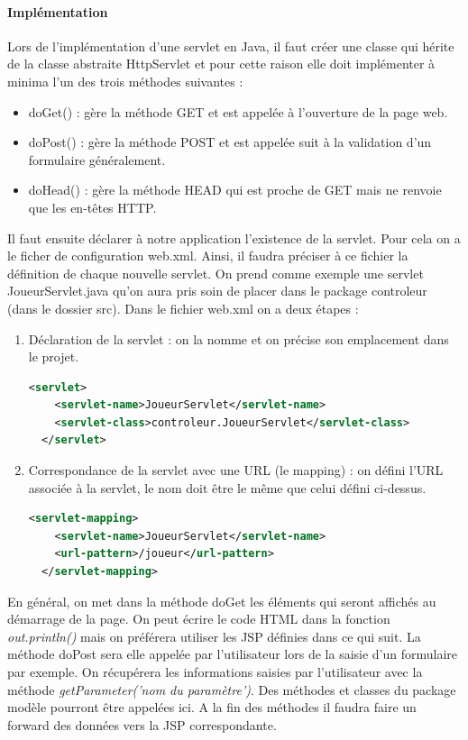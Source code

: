 \paragraph{Implémentation}
Lors de l'implémentation d'une servlet en Java, il faut créer une classe qui hérite de la classe abstraite HttpServlet et pour cette raison elle doit implémenter à
minima l'un des trois méthodes suivantes :
\begin{itemize}
 \item doGet() : gère la méthode GET et est appelée à l'ouverture de la page web.
 \item doPost() : gère la méthode POST et est appelée suit à la validation d'un formulaire généralement.
 \item doHead() : gère la méthode HEAD qui est proche de GET mais ne renvoie que les en-têtes HTTP.
\end{itemize}
Il faut ensuite déclarer à notre application l'existence de la servlet. Pour cela on a le ficher de configuration web.xml. Ainsi, il faudra préciser à ce fichier la définition de chaque nouvelle servlet.
On prend comme exemple une servlet JoueurServlet.java qu'on aura pris soin de placer dans le package controleur (dans le dossier src). Dans le fichier web.xml on a deux étapes :
\begin{enumerate}
 \item Déclaration de la servlet : on la nomme et on précise son emplacement dans le projet.
\begin{lstlisting}[language=XML]
  <servlet>
    <servlet-name>JoueurServlet</servlet-name>
    <servlet-class>controleur.JoueurServlet</servlet-class>
  </servlet>
\end{lstlisting}  
 \item Correspondance de la servlet avec une URL (le mapping) : on défini l'URL associée à la servlet, le nom doit être le même que celui défini ci-dessus.
\begin{lstlisting}[language=XML]
  <servlet-mapping>
    <servlet-name>JoueurServlet</servlet-name>
    <url-pattern>/joueur</url-pattern>
  </servlet-mapping>
\end{lstlisting}  
\end{enumerate}

En général, on met dans la méthode doGet les éléments qui seront affichés au démarrage de la page. On peut écrire le code HTML dans la fonction \textit{out.println()} mais on préférera utiliser les JSP définies dans ce qui suit. La méthode doPost sera elle appelée par l'utilisateur lors de la saisie d'un formulaire par exemple. On récupérera les informations saisies par l'utilisateur avec la méthode \textit{getParameter('nom du paramètre')}.
Des méthodes et classes du package modèle pourront être appelées ici. A la fin des méthodes il faudra faire un forward des données vers la JSP correspondante.\\

